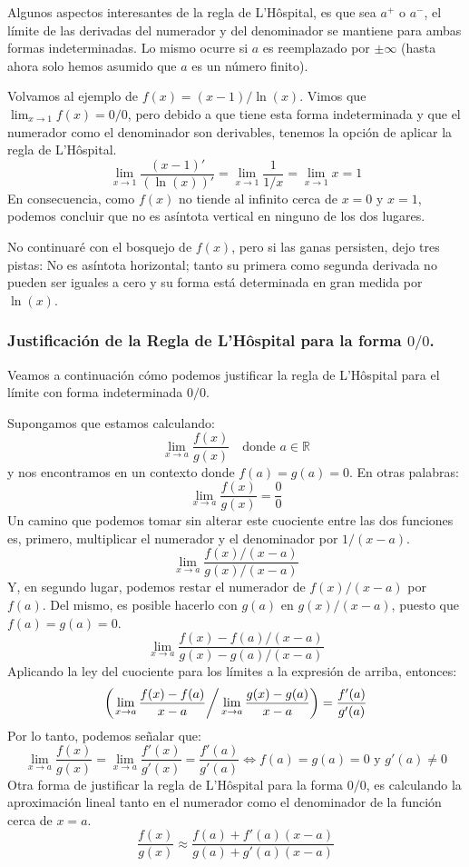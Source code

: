 \documentclass[12pt]{article}
\begin{document}
Algunos aspectos interesantes de la regla de L'Hôspital, es que sea $a^{+}$ o $a^{-}$, el límite de las derivadas del numerador y del denominador se mantiene para ambas formas indeterminadas. Lo mismo ocurre si $a$ es reemplazado por $\pm \infty$ (hasta ahora solo hemos asumido que $a$ es un número finito).

Volvamos al ejemplo de $f(x) = (x - 1)/\ln(x)$. Vimos que $\lim_{x \to 1} f(x) = 0/0$, pero debido a que tiene esta forma indeterminada y que el numerador como el denominador son derivables, tenemos la opción de aplicar la regla de L'Hôspital.
\[
\lim_{x \to 1} \frac{(x - 1)'}{(\ln(x))'} =
\lim_{x \to 1} \frac{1}{1/x} =
\lim_{x \to 1} x = 1
\]
En consecuencia, como $f(x)$ no tiende al infinito cerca de $x = 0$ y $x = 1$, podemos concluir que no es asíntota vertical en ninguno de los dos lugares.

No continuaré con el bosquejo de $f(x)$, pero si las ganas persisten, dejo tres pistas: No es asíntota horizontal; tanto su primera como segunda derivada no pueden ser iguales a cero y su forma está determinada en gran medida por $\ln(x)$.

\subsubsection{Justificación de la Regla de L'Hôspital para la forma $0/0$.}

Veamos a continuación cómo podemos justificar la regla de L'Hôspital para el límite con forma indeterminada $0/0$.

Supongamos que estamos calculando:
\[
	\lim_{x \to a} \frac{f(x)}{g(x)} \quad
	\text{donde } a \in \mathbb{R}
\]
y nos encontramos en un contexto donde  $f(a) = g(a) = 0$. En otras palabras:
\[
	\lim_{x \to a} \frac{f(x)}{g(x)} = \frac{0}{0}
\]
Un camino que podemos tomar sin alterar este cuociente entre las dos funciones es, primero, multiplicar el numerador y el denominador por $1/(x-a)$.
\[
	\lim_{x \to a} \frac{f(x)/(x - a)}{g(x)/(x - a)}
\]
Y, en segundo lugar, podemos restar el numerador de $f(x)/(x - a)$ por $f(a)$. Del mismo, es posible hacerlo con $g(a)$ en $g(x)/(x - a)$, puesto que $f(a) = g(a) = 0$.
\[
	\lim_{x \to a} \frac{f(x) - f(a)/(x - a)}{g(x) - g(a)/(x - a)}
\]
Aplicando la ley del cuociente para los límites a la expresión de arriba, entonces:
\[
\left(
	\left.
	\lim_{x \to a} \frac{f(x) - f(a)}{x - a}
	\right/
	\lim_{x \to a} \frac{g(x) - g(a)}{x - a}
\right) =
\frac{f'(a)}{g'(a)}
\]
Por lo tanto, podemos señalar que:
\[
	\lim_{x \to a} \frac{f(x)}{g(x)} = 
	\lim_{x \to a} \frac{f'(x)}{g'(x)} = 
	\frac{f'(a)}{g'(a)}
	\iff
	f(a) = g(a) = 0 \text{ y }
	g'(a) \neq 0
\]
Otra forma de justificar la regla de L'Hôspital para la forma $0/0$, es calculando la aproximación lineal tanto en el numerador como el denominador de la función cerca de $x = a$.
\[
\frac{f(x)}{g(x)} \approx
	\frac{f(a) + f'(a)(x - a)}{g(a) + g'(a)(x - a)}
\]
\end{document}
